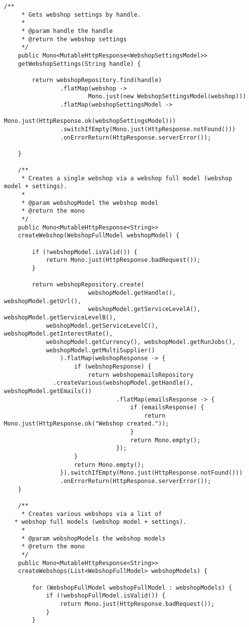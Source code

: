 \begin{lstlisting}[frame=bt,numbers=none]
	/**
	 * Gets webshop settings by handle.
	 *
	 * @param handle the handle
	 * @return the webshop settings
	 */
	public Mono<MutableHttpResponse<WebshopSettingsModel>>
    getWebshopSettings(String handle) {

		return webshopRepository.find(handle)
				.flatMap(webshop ->
						Mono.just(new WebshopSettingsModel(webshop)))
				.flatMap(webshopSettingsModel ->
						Mono.just(HttpResponse.ok(webshopSettingsModel)))
				.switchIfEmpty(Mono.just(HttpResponse.notFound()))
				.onErrorReturn(HttpResponse.serverError());

	}

	/**
	 * Creates a single webshop via a webshop full model (webshop model + settings).
	 *
	 * @param webshopModel the webshop model
	 * @return the mono
	 */
	public Mono<MutableHttpResponse<String>>
    createWebshop(WebshopFullModel webshopModel) {

		if (!webshopModel.isValid()) {
			return Mono.just(HttpResponse.badRequest());
		}

		return webshopRepository.create(
						webshopModel.getHandle(), webshopModel.getUrl(),
						webshopModel.getServiceLevelA(), webshopModel.getServiceLevelB(),
            webshopModel.getServiceLevelC(), webshopModel.getInterestRate(),
            webshopModel.getCurrency(), webshopModel.getRunJobs(),
            webshopModel.getMultiSupplier()
				).flatMap(webshopResponse -> {
					if (webshopResponse) {
						return webshopemailsRepository
              .createVarious(webshopModel.getHandle(), webshopModel.getEmails())
								.flatMap(emailsResponse -> {
									if (emailsResponse) {
										return Mono.just(HttpResponse.ok("Webshop created."));
									}
									return Mono.empty();
								});
					}
					return Mono.empty();
				}).switchIfEmpty(Mono.just(HttpResponse.notFound()))
				.onErrorReturn(HttpResponse.serverError());
	}

	/**
	 * Creates various webshops via a list of
   * webshop full models (webshop model + settings).
	 *
	 * @param webshopModels the webshop models
	 * @return the mono
	 */
	public Mono<MutableHttpResponse<String>>
    createWebshops(List<WebshopFullModel> webshopModels) {

		for (WebshopFullModel webshopFullModel : webshopModels) {
			if (!webshopFullModel.isValid()) {
				return Mono.just(HttpResponse.badRequest());
			}
		}


\end{lstlisting}
